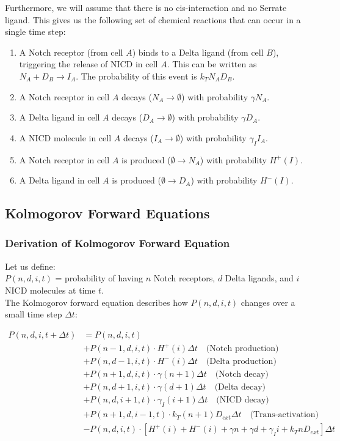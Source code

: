 \documentclass{article}
\begin{document}
\begin{flushleft}
\newpage

Furthermore, we will assume that there is no cis-interaction and no Serrate ligand. This gives us the following set of chemical reactions that can occur in a single time step:

\begin{enumerate}
  \item A Notch receptor (from cell $A$) binds to a Delta ligand (from cell $B$), triggering the release of NICD in cell $A$. This can be written as $N_{A} + D_{B} \rightarrow I_{A}$. The probability of this event is $k_{T}N_{A}D_{B}$.
  \item A Notch receptor in cell $A$ decays ($N_{A} \rightarrow \emptyset$) with probability $\gamma N_{A}$.
  \item A Delta ligand in cell $A$ decays ($D_{A} \rightarrow \emptyset$) with probability $\gamma D_{A}$.
  \item A NICD molecule in cell $A$ decays ($I_{A} \rightarrow \emptyset$) with probability $\gamma_{I}I_{A}$.
  \item A Notch receptor in cell $A$ is produced ($\emptyset \rightarrow N_{A}$) with probability $H^{+}(I)$.
  \item A Delta ligand in cell $A$ is produced ($\emptyset \rightarrow D_{A}$) with probability $H^{-}(I)$.
\end{enumerate}

\subsection{Kolmogorov Forward Equations}
\subsubsection{Derivation of Kolmogorov Forward Equation}

Let us define:\\
$P(n,d,i,t)$ = probability of having $n$ Notch receptors, $d$ Delta ligands, and $i$ NICD molecules at time $t$.\\

The Kolmogorov forward equation describes how $P(n,d,i,t)$ changes over a small time step $\Delta t$:

\begin{align*}
P(n,d,i,t+\Delta t) &= P(n,d,i,t) \\
&+ P(n-1,d,i,t) \cdot H^+(i) \Delta t \quad \text{(Notch production)} \\
&+ P(n,d-1,i,t) \cdot H^-(i) \Delta t \quad \text{(Delta production)} \\
&+ P(n+1,d,i,t) \cdot \gamma(n+1)\Delta t \quad \text{(Notch decay)} \\
&+ P(n,d+1,i,t) \cdot \gamma(d+1)\Delta t \quad \text{(Delta decay)} \\
&+ P(n,d,i+1,t) \cdot \gamma_I(i+1)\Delta t \quad \text{(NICD decay)} \\
&+ P(n+1,d,i-1,t) \cdot k_T(n+1)D_{ext}\Delta t \quad \text{(Trans-activation)} \\
&- P(n,d,i,t) \cdot [H^+(i) + H^-(i) + \gamma n + \gamma d + \gamma_I i + k_T n D_{ext}]\Delta t
\end{align*}


\end{flushleft}
\end{document}
